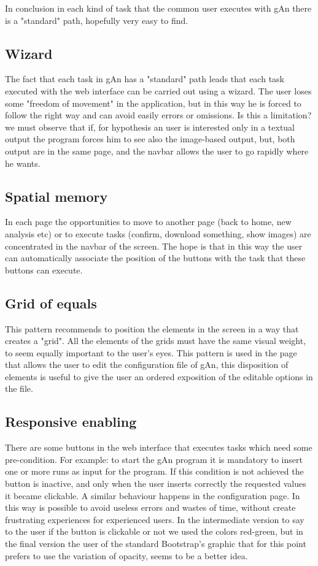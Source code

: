 In conclusion in each kind of task that the common user executes with gAn there is a "standard" path, hopefully very easy to find. 

\subsection{Wizard}
The fact that each task in gAn has a "standard" path leads that each task executed with the web interface can be carried out using a wizard. The user loses some "freedom of movement" in the application, but in this way he is forced to follow the right way and can avoid easily errors or omissions.
Is this a limitation? we must observe that if, for hypothesis an user is interested only in a textual output the program forces him to see also the image-based output, but, both output are in the same page, and the navbar allows the user to go rapidly where he wants.

\subsection{Spatial memory}
In each page the opportunities to move to another page (back to home, new analysis etc) or to execute tasks (confirm, download something, show images) are concentrated in the navbar of the screen. The hope is that in this way the user can automatically associate the position of the buttons with the task that these buttons can execute.

\subsection{Grid of equals}
This pattern recommends to position the elements in the screen in a way that creates a "grid". All the elements of the grids must have the same visual weight, to seem equally important to the user's eyes.
This pattern is used in the page that allows the user to edit the configuration file of gAn, this disposition of elements is useful to give the user an ordered exposition of the editable options in the file.


\subsection{Responsive enabling}
There are some buttons in the web interface that executes tasks which need some pre-condition. For example: to start the gAn program it is mandatory to insert one or more runs as input for the program. If this condition is not achieved the button is inactive, and only when the user inserts correctly the requested values it became clickable. A similar behaviour happens in the configuration page. In this way is possible to avoid useless errors and wastes of time, without create frustrating experiences for experienced users. In the intermediate version to say to the user if the button is clickable or not we used the colors red-green, but in the final version the user of the standard Bootstrap's graphic that for this point prefers to use the variation of opacity, seems to be a better idea.   

